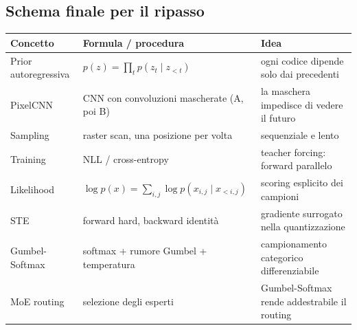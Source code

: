 \documentclass[11pt,a4paper]{article}
\begin{document}
\subsection{Schema finale per il ripasso}
\begin{center}
\renewcommand{\arraystretch}{1.35}
\begin{tabular}{|p{3.1cm}|p{5.4cm}|p{5.2cm}|}
\hline
\textbf{Concetto} & \textbf{Formula / procedura} & \textbf{Idea} \\
\hline
Prior autoregressiva & $p(z)=\prod_t p(z_t\mid z_{<t})$ & ogni codice dipende solo dai precedenti \\
\hline
PixelCNN & CNN con convoluzioni mascherate (A, poi B) & la maschera impedisce di vedere il futuro \\
\hline
Sampling & raster scan, una posizione per volta & sequenziale e lento \\
\hline
Training & NLL / cross-entropy & teacher forcing: forward parallelo \\
\hline
Likelihood & $\log p(x)=\sum_{i,j}\log p(x_{i,j}\mid x_{<i,j})$ & scoring esplicito dei campioni \\
\hline
STE & forward hard, backward identità & gradiente surrogato nella quantizzazione \\
\hline
Gumbel-Softmax & softmax + rumore Gumbel + temperatura & campionamento categorico differenziabile \\
\hline
MoE routing & selezione degli esperti & Gumbel-Softmax rende addestrabile il routing \\
\hline
\end{tabular}
\end{center}
\end{document}
